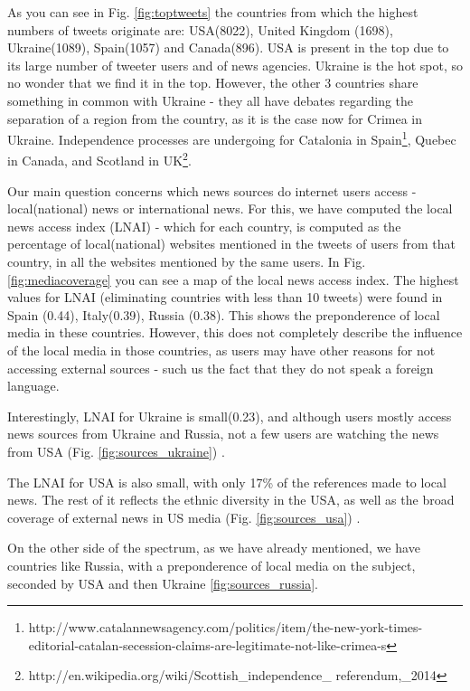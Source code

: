 \documentclass{acm_proc_10ptArticle-sp}
\begin{document}
As you can see in Fig. \ref{fig:toptweets} the countries from which the highest numbers of tweets originate are: USA(8022), United Kingdom (1698), Ukraine(1089), Spain(1057) and Canada(896). USA is present in the top due to its large number of tweeter users and of news agencies. Ukraine is the hot spot, so no wonder that we find it in the top. However, the other 3 countries share something in common with Ukraine - they all have debates regarding the separation of a region from the country, as it is the case now for Crimea in Ukraine. Independence processes are undergoing for Catalonia in Spain\footnote{http://www.catalannewsagency.com/politics/item/the-new-york-times-editorial-catalan-secession-claims-are-legitimate-not-like-crimea-s}, Quebec in Canada, and Scotland in UK\footnote{http://en.wikipedia.org/wiki/Scottish\_independence\_ referendum,\_2014}.

Our main question concerns which news sources do internet users access - local(national) news or international news. For this, we have computed the local news access index (LNAI) - which for each country, is computed as the percentage of local(national) websites mentioned in the tweets of users from that country, in all the websites mentioned by the same users. In Fig. \ref{fig:mediacoverage} you can see a map of the local news access index. The highest values for LNAI (eliminating countries with less than 10 tweets) were found in Spain (0.44), Italy(0.39), Russia (0.38). This shows the preponderence of local media in these countries. However, this does not completely describe the influence of the local media in those countries, as users may have other reasons for not accessing external sources - such us the fact that they do not speak a foreign language. 

Interestingly, LNAI for Ukraine is small(0.23), and although users mostly access news sources from Ukraine and Russia, not a few users are watching the news from USA (Fig. \ref{fig:sources_ukraine}) .

The LNAI for USA is also small, with only 17\% of the references made to local news. The rest of it reflects the ethnic diversity in the USA, as well as the broad coverage of external news in US media (Fig. \ref{fig:sources_usa}) . 

On the other side of the spectrum, as we have already mentioned, we have countries like Russia, with a preponderence of local media on the subject, seconded by USA and then Ukraine \ref{fig:sources_russia}.
\end{document}
